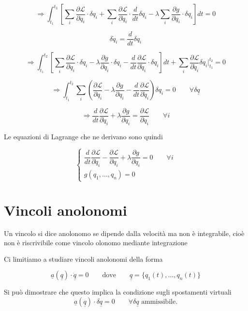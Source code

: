 \[
\Rightarrow
\int_{t_1}^{t_2}
\left[
\sum_i \frac{\partial \mathcal{L}}{\partial q_i}\cdot \delta q_i
+
\sum_i \frac{\partial \mathcal{L}}{\partial \dot{q}_i}\cdot \frac{d}{dt}\delta q_i
-
\lambda\sum_i \frac{\partial g}{\partial q_i}\cdot \delta q_i
\right]dt
=0
\]

\[
\delta\dot{q}_i=\frac{d}{dt}\delta q_i
\]

\[
\Rightarrow
\int_{t_1}^{t_2}
\left[
\sum_i \frac{\partial \mathcal{L}}{\partial q_i}\cdot \delta q_i
-
\lambda \frac{\partial g}{\partial q_i}\cdot \delta q_i
-
\frac{d}{dt}\frac{\partial \mathcal{L}}{\partial \dot{q}_i}\cdot \delta q_i
\right]dt
+
\sum_i
\frac{\partial \mathcal{L}}{\partial \dot{q}_i}\delta q_i
\Big|_{t_1}^{t_2}
=0
\]

\[
\Rightarrow
\int_{t_1}^{t_2}
\sum_i
\left(
\frac{\partial \mathcal{L}}{\partial q_i}
-
\lambda\frac{\partial g}{\partial q_i}
-
\frac{d}{dt}\frac{\partial \mathcal{L}}{\partial \dot{q}_i}
\right)\delta q_i
=0
\qquad
\forall \delta\underline{q}
\]

\[
\Rightarrow
\frac{d}{dt}\frac{\partial \mathcal{L}}{\partial \dot{q}_i}
+
\lambda\frac{\partial g}{\partial q_i}
=
\frac{\partial \mathcal{L}}{\partial q_i}
\qquad
\forall i
\]

Le equazioni di Lagrange che ne derivano sono quindi

\[
\begin{cases}
\dfrac{d}{dt}\dfrac{\partial \mathcal{L}}{\partial \dot{q}_i}
-
\dfrac{\partial \mathcal{L}}{\partial q_i}
+
\lambda\dfrac{\partial g}{\partial q_i}
=0
\qquad
\forall i
\\[1em]
g(q_1,\ldots,q_n)=0
\end{cases}
\]

\section{Vincoli anolonomi}
Un vincolo si dice anolonomo se dipende dalla velocità ma
non è integrabile, cioè non è riscrivibile come vincolo olonomo
mediante integrazione

Ci limitiamo a studiare vincoli anolonomi della forma

\[
\underline{a}(\underline{q}) \cdot \dot{\underline{q}} = 0
\qquad \text{dove} \qquad
\underline{q} = \{q_1(t), \ldots, q_n(t)\}
\]

Si può dimostrare che questo implica la condizione sugli
spostamenti virtuali
\[
\underline{a}(\underline{q}) \cdot \delta \underline{q} = 0
\qquad \forall \delta \underline{q} \text{ ammissibile}.
\]

